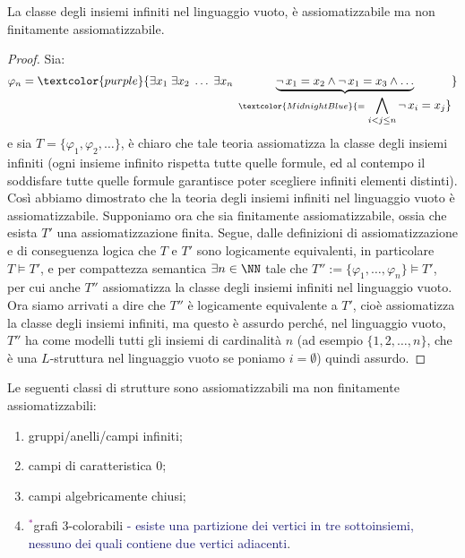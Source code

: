 \begin{example}
    La classe degli insiemi infiniti nel linguaggio vuoto, è assiomatizzabile ma non finitamente assiomatizzabile.
\end{example}

\begin{proof}
    Sia:
    \[ \varphi_n = \textcolor{purple}{\exists x_1 \; \exists x_2 \; \ldots \; \exists x_n \; \underbrace{\neg \, x_1 = x_2 \land \neg \, x_1 = x_3 \land \ldots}_{\textcolor{MidnightBlue}{= \displaystyle\bigwedge_{i < j \leq n} \neg\, x_i = x_j}}}
    \]
    e sia $T = \{\varphi_1, \varphi_2, \ldots\}$, è chiaro che tale teoria assiomatizza la classe degli insiemi infiniti (ogni insieme infinito rispetta tutte quelle formule, ed al contempo il soddisfare tutte quelle formule garantisce poter scegliere infiniti elementi distinti).\\
    Così abbiamo dimostrato che la teoria degli insiemi infiniti nel linguaggio vuoto è assiomatizzabile. Supponiamo ora che sia finitamente assiomatizzabile, ossia che esista $T'$ una assiomatizzazione finita. Segue, dalle definizioni di 
    assiomatizzazione e di conseguenza logica che $T$ e $T'$ sono logicamente equivalenti, in particolare $T \models T'$, e per compattezza semantica $\exists n \in \NN$ tale che $T'' := \{\varphi_1, \ldots, \varphi_n\} \models T'$, per cui anche $T''$ assiomatizza la classe degli insiemi infiniti nel linguaggio vuoto.
    Ora siamo arrivati a dire che $T''$ è logicamente equivalente a $T'$, cioè assiomatizza la classe degli insiemi infiniti, ma questo è assurdo perché, nel linguaggio vuoto, $T''$ ha come modelli tutti gli insiemi di cardinalità $n$ (ad esempio $\{1, 2, \ldots, n\}$, che è una $L$-struttura nel linguaggio vuoto se poniamo $i = \emptyset$) quindi assurdo.
\end{proof}

\begin{exercise}
    Le seguenti classi di strutture sono assiomatizzabili ma non finitamente assiomatizzabili:
    \begin{enumerate}
        \item gruppi/anelli/campi infiniti;
        \item campi di caratteristica 0;
        \item campi algebricamente chiusi;
        \item \textcolor{purple}{${}^*$}grafi 3-colorabili \textcolor{MidnightBlue}{- esiste una partizione dei vertici in tre sottoinsiemi, nessuno dei quali contiene due vertici adiacenti}.
    \end{enumerate}
\end{exercise}

